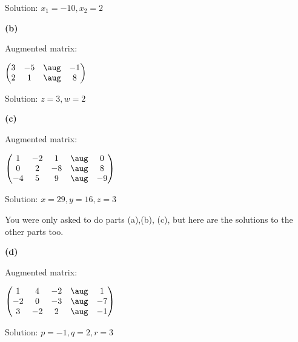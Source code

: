 \documentclass[oneside,12pt]{amsart}
\begin{document}
Solution: $x_1 = -10, x_2 = 2$

\bigskip


\textbf{(b)}

Augmented matrix:

\bigskip

$
\begin{pmatrix}
   3  &  -5  & \aug & -1  \\
   2  &  1  & \aug  & 8  \\
\end{pmatrix}
$

\bigskip

Solution: $z = 3, w = 2$


\bigskip

\textbf{(c)}

Augmented matrix:

\bigskip

$
\begin{pmatrix}
   1  & -2   & 1  & \aug  & 0  \\
   0  &  2   & -8 & \aug  & 8  \\
   -4 &  5   & 9  & \aug  & -9  \\
\end{pmatrix}
$

\bigskip

Solution: $x=29, y=16, z=3$


\bigskip

You were only asked to do parts (a),(b), (c), but here are the solutions
to the other parts too.

\medskip

\textbf{(d)}

Augmented matrix:

\bigskip

$
\begin{pmatrix}
   1   &  4   & -2  & \aug  & 1  \\
   -2  &  0   & -3  & \aug  & -7  \\
   3   &  -2  &  2  & \aug  & -1  \\
\end{pmatrix}
$

\bigskip

Solution: $p=-1, q=2, r=3$

\end{document}
